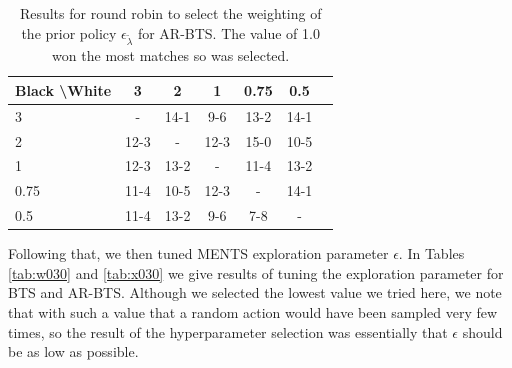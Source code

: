 \documentclass{article}
\theoremstyle{plain}
\begin{document}
\begin{appendices}
            \begin{table}[]
            \centering
                \begin{tabular}{l|cccccc}
                    \textbf{Black \textbackslash White}     & 3  & 2   & 1   & 0.75    & 0.5    \\ 
                    \hline
                                            3            & - & 14-1 & 9-6 & 13-2 & 14-1   		\\
                                            2            & 12-3 & - & 12-3 & 15-0 & 10-5   		\\
                                            1          & 12-3 & 13-2 & - & 11-4 & 13-2   		\\
                                            0.75          & 11-4 & 10-5 & 12-3 & - & 14-1   		\\
                                            0.5         & 11-4 & 13-2 & 9-6 & 7-8 &   -   	\\   
                \end{tabular}
                \caption{Results for round robin to select the weighting of the prior policy $\epsilon_{\tilde{\lambda}}$ for AR-BTS. The value of 1.0 won the most matches so was selected. \label{tab:x020}}
            \end{table}
            
            
            
            
            
            
            Following that, we then tuned MENTS exploration parameter $\epsilon$. In Tables \ref{tab:w030} and \ref{tab:x030} we give results of tuning the exploration parameter for BTS and AR-BTS. Although we selected the lowest value we tried here, we note that with such a value that a random action would have been sampled very few times, so the result of the hyperparameter selection was essentially that $\epsilon$ should be as low as possible.
            

\end{appendices}
\end{document}
